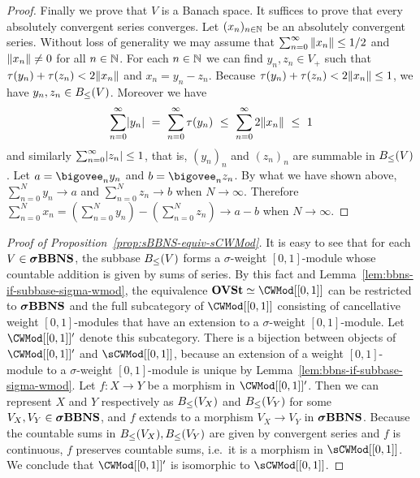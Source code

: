 \documentclass[%
	submission,
copyright,creativecommons,UKenglish]{eptcs}
\begin{document}
\begin{proof}
Finally we prove that $V$ is a Banach space.
It suffices to prove that
every absolutely convergent series converges.
Let $(x_n)_{n\in\mathbb{N}}$
be an absolutely convergent series.
Without loss of generality we may assume that
$\sum_{n=0}^{\infty} \norm{x_n}\le 1/2$
and $\norm{x_n}\neq 0$ for all $n\in\mathbb{N}$.
For each $n\in\mathbb{N}$ we can find $y_n,z_n\in V_+$
such that $\tau(y_n)+\tau(z_n)< 2\norm{x_n}$
and $x_n=y_n-z_n$.
Because $\tau(y_n)+\tau(z_n)< 2\norm{x_n}\le 1$,
we have $y_n,z_n\in B_{\le}(V)$.
Moreover we have
\[
\sum_{n=0}^\infty\lvert y_n\rvert
\ =\ \sum_{n=0}^\infty\tau(y_n)
\ \le\  \sum_{n=0}^\infty 2\norm{x_n}
\ \le\  1
\]
and similarly $\sum_{n=0}^\infty\lvert z_n\rvert\le 1$,
that is, $(y_n)_n$ and $(z_n)_n$ are summable in $B_{\le}(V)$.
Let $a= \bigovee_n y_n$
and $b= \bigovee_n z_n$.
By what we have shown above,
$\sum_{n=0}^N y_n\to a$ and $\sum_{n=0}^N z_n\to b$
when $N\to \infty$.
Therefore $\sum_{n=0}^N x_n=(\sum_{n=0}^N y_n)-
(\sum_{n=0}^N z_n)\to a-b$ when $N\to \infty$.
\end{proof}

\begin{proof}[Proof of Proposition~\ref{prop:sBBNS-equiv-sCWMod}]
It is easy to see that for each $V\in \boldsymbol{\sigma}\mathbf{BBNS}$,
the subbase $B_{\le}(V)$ forms a $\sigma$-weight $[0,1]$-module
whose countable addition is given by sums of series.
By this fact and
Lemma~\ref{lem:bbns-if-subbase-sigma-wmod},
the equivalence $\OVSt\simeq\CWMod[[0,1]]$
can be restricted to
$\boldsymbol{\sigma}\mathbf{BBNS}$ and the full subcategory
of $\CWMod[[0,1]]$ consisting of cancellative weight $[0,1]$-modules
that have an extension to a $\sigma$-weight $[0,1]$-module.
Let $\CWMod[[0,1]]'$ denote this subcategory.
There is a bijection between objects
of $\CWMod[[0,1]]'$ and $\sCWMod[[0,1]]$,
because an extension of a weight $[0,1]$-module to
a $\sigma$-weight $[0,1]$-module is unique by
Lemma~\ref{lem:bbns-if-subbase-sigma-wmod}.
Let $f\colon X\to Y$ be a morphism in $\CWMod[[0,1]]'$.
Then we can represent
$X$ and $Y$ respectively as
$B_{\le}(V_X)$ and $B_{\le}(V_Y)$ for some $V_X,V_Y\in \boldsymbol{\sigma}\mathbf{BBNS}$,
and $f$ extends to a morphism $V_X\to V_Y$ in $\boldsymbol{\sigma}\mathbf{BBNS}$.
Because
the countable sums in $B_{\le}(V_X),B_{\le}(V_Y)$ are given by convergent series
and $f$ is continuous,
$f$ preserves countable sums,
i.e.\ it is a morphism in $\sCWMod[[0,1]]$.
We conclude that
$\CWMod[[0,1]]'$ is isomorphic to $\sCWMod[[0,1]]$.
\end{proof}
\end{document}
